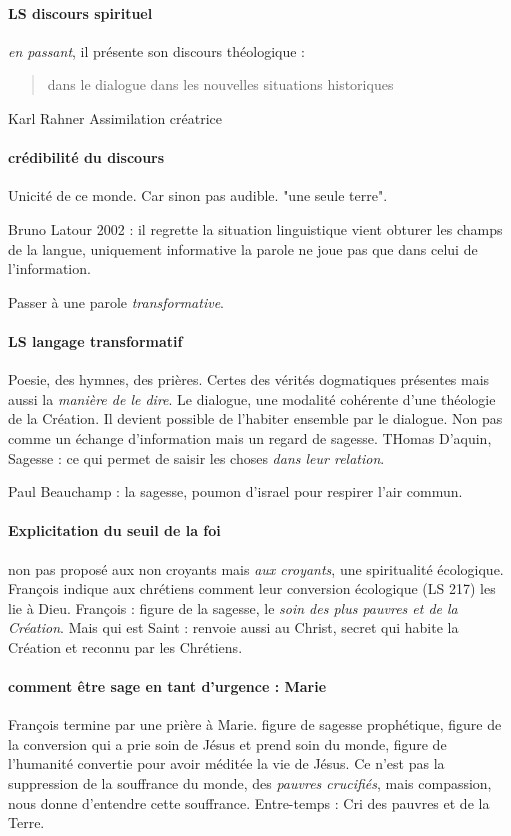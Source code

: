 \paragraph{LS discours spirituel} \textit{en passant}, il présente son discours théologique : 

\begin{quote}
    dans le dialogue dans les nouvelles situations historiques
\end{quote}

Karl Rahner 
Assimilation créatrice

\paragraph{crédibilité du discours} Unicité de ce monde. Car sinon pas audible. "une seule terre".

Bruno Latour 2002 : il regrette la situation linguistique vient obturer les champs de la langue, uniquement informative 
la parole ne joue pas que dans celui de l'information.

Passer à une parole \textit{transformative}. 

\paragraph{LS langage transformatif} Poesie, des hymnes, des prières.  Certes des vérités dogmatiques présentes mais aussi la \textit{manière de le dire}. Le dialogue, une modalité cohérente d'une théologie de la Création. Il devient possible de l'habiter ensemble par le dialogue.
Non pas comme un échange d'information mais un regard de sagesse.
THomas D'aquin, Sagesse : ce qui permet de saisir les choses \textit{dans leur relation}. 

Paul Beauchamp : la sagesse, poumon d'israel pour respirer l'air commun.

\paragraph{Explicitation du seuil de la foi} non pas proposé aux non croyants mais \textit{aux croyants}, une spiritualité écologique. François indique aux chrétiens comment leur conversion écologique (LS 217) les lie à Dieu.
François : figure de la sagesse, le \textit{soin des plus pauvres et de la Création}. Mais qui est Saint : renvoie aussi au Christ, secret qui habite la Création et reconnu par les Chrétiens.

\paragraph{comment être sage en tant d'urgence : Marie} François termine par une prière à Marie. figure de sagesse prophétique, figure de la conversion qui a prie soin de Jésus et prend soin du monde, figure de l'humanité convertie pour avoir méditée la vie de Jésus. Ce n'est pas la suppression de la souffrance du monde, des \textit{pauvres crucifiés}, mais compassion, nous donne d'entendre cette souffrance.
Entre-temps : Cri des pauvres et de la Terre.

